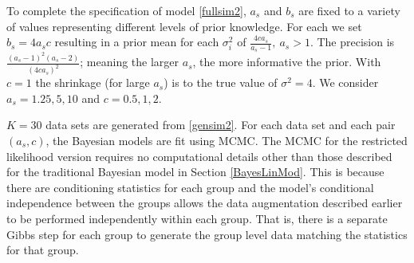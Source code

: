 \documentclass[ba]{imsart}
\begin{document}
To complete the specification of model \eqref{fullsim2},  $a_{s}$ and $b_{s}$ are fixed to a variety of values representing different levels of prior knowledge. For each we set $b_{s} = 4a_{s}c$ resulting in a prior mean for each $\sigma^{2}_{i}$ of $\frac{4ca_{s}}{a_{s}-1}, \ a_{s} >1$. The precision is $\frac{(a_{s} -1)^{2}(a_{s}-2)}{(4ca_{s})^{2}}$; meaning the larger $a_{s}$, the more informative the prior. With $c = 1$ the shrinkage (for large $a_{s}$) is to the true value of $\sigma^{2} = 4$. We consider $a_{s} = 1.25,  5, 10$ and $c = 0.5, 1, 2$. %

$K = 30$ data sets are generated from \eqref{gensim2}. For each data set and each pair $(a_{s}, c)$, the Bayesian models are fit using MCMC. The MCMC for the restricted likelihood version requires no computational details other than those described for the traditional Bayesian model in Section \ref{BayesLinMod}. This is because there are conditioning statistics for each group and the model's conditional independence between the groups allows the data augmentation described earlier to be performed independently within each group. That is, there is a separate Gibbs step for each group to generate the group level data matching the statistics for that group. 
\end{document}
